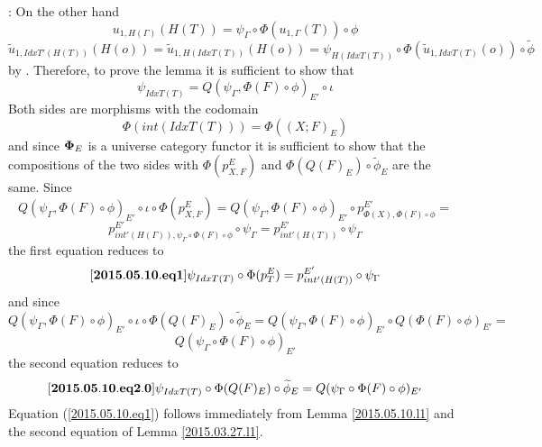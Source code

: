\documentclass[12pt]{article}
\newenvironment{eq}{\begin{equation}}{\end{equation}}
\newenvironment{myproof}{{\bf Proof}:}{\vskip 5mm }
\newcommand{\llabel}[1]{\label{#1}[{\bf #1}]}
\newcommand{\wt}{\widetilde}
\begin{document}
\begin{myproof}
On the other hand 
%
$$u_{1,H(\Gamma)}(H(T))=\psi_{\Gamma}\circ \Phi(u_{1,\Gamma}(T))\circ \phi$$
$$\wt{u}_{1,IdxT'(H(T))}(H(o))=\wt{u}_{1,H(IdxT(T))}(H(o))=\psi_{H(IdxT(T))}\circ \Phi(\wt{u}_{1,IdxT(T)}(o))\circ \wt{\phi}$$
%
by \cite[Lemma 6.1(1,2)]{fromunivwithPi}. Therefore, to prove the lemma it is sufficient to show that
%
$$\psi_{IdxT(T)}=Q(\psi_{\Gamma},\Phi(F)\circ\phi)_{E'}\circ\iota$$
%
Both sides are morphisms with the codomain 
%
$$\Phi(int(IdxT(T)))=\Phi((X;F)_E)$$
%
and since ${\bf\Phi}_E$ is a universe category functor it is sufficient to show that the compositions of the two sides with $\Phi(p^E_{X,F})$ and $\Phi(Q(F)_E)\circ \wt{\phi}_E$ are the same. Since
%
$$Q(\psi_{\Gamma},\Phi(F)\circ\phi)_{E'}\circ\iota\circ \Phi(p^E_{X,F})=Q(\psi_{\Gamma},\Phi(F)\circ\phi)_{E'}\circ p^{E'}_{\Phi(X),\Phi(F)\circ\phi}=$$
$$p^{E'}_{int'(H(\Gamma)),\psi_{\Gamma}\circ \Phi(F)\circ\phi}\circ\psi_{\Gamma}=p^{E'}_{int'(H(T))}\circ\psi_{\Gamma}$$
%
the first equation reduces to
%
\begin{eq}
\llabel{2015.05.10.eq1}
\psi_{IdxT(T)}\circ \Phi(p^E_{T})=p^{E'}_{int'(H(T))}\circ\psi_{\Gamma}
\end{eq}
%
and since
%
$$Q(\psi_{\Gamma},\Phi(F)\circ\phi)_{E'}\circ\iota\circ \Phi(Q(F)_E)\circ \wt{\phi}_E=Q(\psi_{\Gamma},\Phi(F)\circ\phi)_{E'}\circ Q(\Phi(F)\circ\phi)_{E'}=$$$$Q(\psi_{\Gamma}\circ \Phi(F)\circ \phi)_{E'}$$
%
the second equation reduces to
%
\begin{eq}
\llabel{2015.05.10.eq2.0}
\psi_{IdxT(T)}\circ \Phi(Q(F)_E)\circ \wt{\phi}_E=Q(\psi_{\Gamma}\circ \Phi(F)\circ \phi)_{E'}
\end{eq}
%
Equation (\ref{2015.05.10.eq1}) follows immediately from Lemma \ref{2015.05.10.l1} and the second equation of Lemma \ref{2015.03.27.l1}.


\end{myproof}
\end{document}
